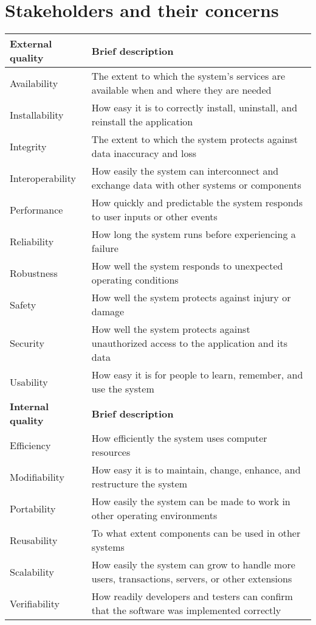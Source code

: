 \section{Stakeholders and their concerns}

\begin{tabular}{|L{}|L{}|}
\toprule
\textbf{External quality} & \textbf{Brief description} \\ \midrule
Availability & The extent to which the system's services are available when and where they are needed\\
Installability & How easy it is to correctly install, uninstall, and reinstall the application \\
Integrity & The extent to which the system protects against data inaccuracy and loss\\
Interoperability & How easily the system can interconnect and exchange data with other systems or components\\
Performance & How quickly and predictable the system responds to user inputs or other events\\
Reliability & How long the system runs before experiencing a failure \\
Robustness & How well the system responds to unexpected operating conditions\\
Safety & How well the system protects against injury or damage\\
Security & How well the system protects against unauthorized access to the application and its data\\
Usability & How easy it is for people to learn, remember, and use the system\\
\midrule
\textbf{Internal quality} & \textbf{Brief description} \\ \midrule
Efficiency & How efficiently the system uses computer resources\\
Modifiability & How easy it is to maintain, change, enhance, and restructure the system\\
Portability & How easily the system can be made to work in other operating environments\\
Reusability & To what extent components can be used in other systems\\
Scalability & How easily the system can grow to handle more users, transactions, servers, or other extensions\\
Verifiability & How readily developers and testers can confirm that the software was implemented correctly\\
\bottomrule
\end{tabular}


